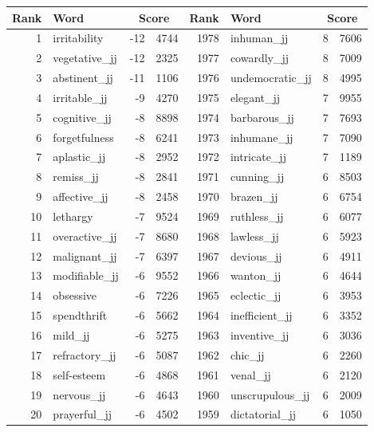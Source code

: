 \begin{table}[tbp]
    \begin{tabular}{| rlr@{.}l | rlr@{.}l |}
    \hline
    \textbf{Rank} & \textbf{Word} & \multicolumn{2}{c|}{\textbf{Score}} & \textbf{Rank} & \textbf{Word} & \multicolumn{2}{c|}{\textbf{Score}} \\
    \hline
    1 & irritability & -12 & 4744    &    1978 & inhuman\_jj & 8 & 7606 \\
    2 & vegetative\_jj & -12 & 2325    &    1977 & cowardly\_jj & 8 & 7009 \\
    3 & abstinent\_jj & -11 & 1106    &    1976 & undemocratic\_jj & 8 & 4995 \\
    4 & irritable\_jj & -9 & 4270    &    1975 & elegant\_jj & 7 & 9955 \\
    5 & cognitive\_jj & -8 & 8898    &    1974 & barbarous\_jj & 7 & 7693 \\
    6 & forgetfulness & -8 & 6241    &    1973 & inhumane\_jj & 7 & 7090 \\
    7 & aplastic\_jj & -8 & 2952    &    1972 & intricate\_jj & 7 & 1189 \\
    8 & remiss\_jj & -8 & 2841    &    1971 & cunning\_jj & 6 & 8503 \\
    9 & affective\_jj & -8 & 2458    &    1970 & brazen\_jj & 6 & 6754 \\
    10 & lethargy & -7 & 9524    &    1969 & ruthless\_jj & 6 & 6077 \\
    11 & overactive\_jj & -7 & 8680    &    1968 & lawless\_jj & 6 & 5923 \\
    12 & malignant\_jj & -7 & 6397    &    1967 & devious\_jj & 6 & 4911 \\
    13 & modifiable\_jj & -6 & 9552    &    1966 & wanton\_jj & 6 & 4644 \\
    14 & obsessive & -6 & 7226    &    1965 & eclectic\_jj & 6 & 3953 \\
    15 & spendthrift & -6 & 5662    &    1964 & inefficient\_jj & 6 & 3352 \\
    16 & mild\_jj & -6 & 5275    &    1963 & inventive\_jj & 6 & 3036 \\
    17 & refractory\_jj & -6 & 5087    &    1962 & chic\_jj & 6 & 2260 \\
    18 & self-esteem & -6 & 4868    &    1961 & venal\_jj & 6 & 2120 \\
    19 & nervous\_jj & -6 & 4643    &    1960 & unscrupulous\_jj & 6 & 2009 \\
    20 & prayerful\_jj & -6 & 4502    &    1959 & dictatorial\_jj & 6 & 1050 \\

\end{tabular}
\end{table}
